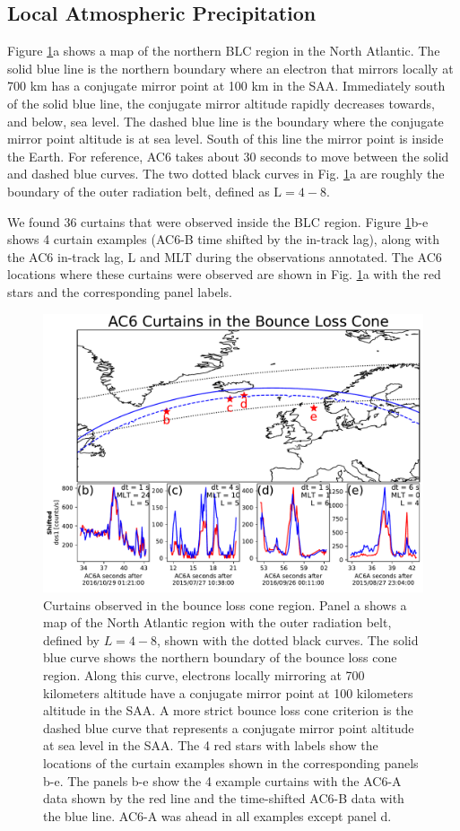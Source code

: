 \documentclass[draft]{agujournal2019}
\begin{document}
\subsection{Local Atmospheric Precipitation}
Figure \ref{fig3}a shows a map of the northern BLC region in the North Atlantic. The solid blue line is the northern boundary where an electron that mirrors locally at 700 km has a conjugate mirror point at 100 km in the SAA. Immediately south of the solid blue line, the conjugate mirror altitude rapidly decreases towards, and below, sea level. The dashed blue line is the boundary where the conjugate mirror point altitude is at sea level. South of this line the mirror point is inside the Earth. For reference, AC6 takes about 30 seconds to move between the solid and dashed blue curves. The two dotted black curves in Fig. \ref{fig3}a are roughly the boundary of the outer radiation belt, defined as $\mathrm{L}=4-8$.

We found 36 curtains that were observed inside the BLC region. Figure \ref{fig3}b-e shows 4 curtain examples (AC6-B time shifted by the in-track lag), along with the AC6 in-track lag, L and MLT during the observations annotated. The AC6 locations where these curtains were observed are shown in Fig. \ref{fig3}a with the red stars and the corresponding panel labels.

\begin{figure}
\includegraphics[width=\textwidth]{fig3.pdf}
\caption{Curtains observed in the bounce loss cone region. Panel a shows a map of the North Atlantic region with the outer radiation belt, defined by $L=4-8$, shown with the dotted black curves. The solid blue curve shows the northern boundary of the bounce loss cone region. Along this curve, electrons locally mirroring at 700 kilometers altitude have a conjugate mirror point at 100 kilometers altitude in the SAA. A more strict bounce loss cone criterion is the dashed blue curve that represents a conjugate mirror point altitude at sea level in the SAA. The 4 red stars with labels show the locations of the curtain examples shown in the corresponding panels b-e. The panels b-e show the 4 example curtains with the AC6-A data shown by the red line and the time-shifted AC6-B data with the blue line. AC6-A was ahead in all examples except panel d.}
\label{fig3}
\end{figure}
\end{document}
